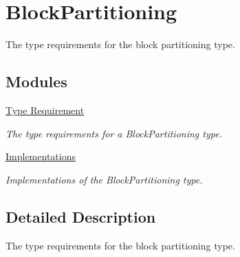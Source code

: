 \hypertarget{group__block__partitioning}{\section{Block\-Partitioning}
\label{group__block__partitioning}
}


The type requirements for the block partitioning type.  


\subsection*{Modules}
\begin{DoxyCompactItemize}
\item 
\hyperlink{group__block__partitioning__type}{Type Requirement}
\begin{DoxyCompactList}\small\item\em The type requirements for a Block\-Partitioning type. \end{DoxyCompactList}\item 
\hyperlink{group__block__partitioning__implementation}{Implementations}
\begin{DoxyCompactList}\small\item\em Implementations of the Block\-Partitioning type. \end{DoxyCompactList}\end{DoxyCompactItemize}


\subsection{Detailed Description}
The type requirements for the block partitioning type. 